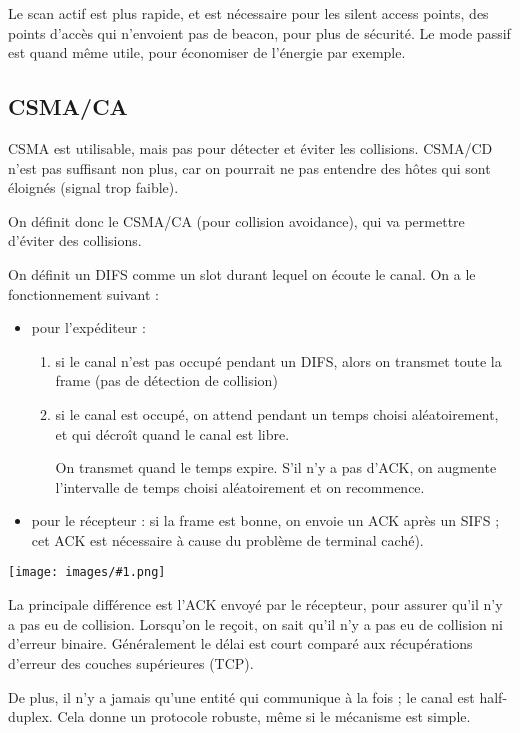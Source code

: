 \documentclass[10pt,a4paper]{report}
\newcommand{\dessin}[1]{\begin{center}\texttt{[image: images/\#1.png]}\end{center}}
\begin{document}
		 Le scan actif est plus rapide, et est nécessaire pour les silent access points, des points d'accès qui n'envoient pas de beacon, pour plus de sécurité. Le mode passif est quand même utile, pour économiser de l'énergie par exemple.
		 
		\subsection{CSMA/CA}
		
		CSMA est utilisable, mais pas pour détecter et éviter les collisions. CSMA/CD n'est pas suffisant non plus, car on pourrait ne pas entendre des hôtes qui sont éloignés (signal trop faible).
		
		On définit donc le CSMA/CA (pour collision avoidance), qui va permettre d'éviter des collisions. 
		
		On définit un DIFS comme un slot durant lequel on écoute le canal. On a le fonctionnement suivant :
		
		\begin{itemize}
			\item pour l'expéditeur :
			
			\begin{enumerate}
				\item si le canal n'est pas occupé pendant un DIFS, alors on transmet toute la frame (pas de détection de collision)
				\item si le canal est occupé, on attend pendant un temps choisi aléatoirement, et qui décroît quand le canal est libre.
				
				On transmet quand le temps expire. S'il n'y a pas d'ACK, on augmente l'intervalle de temps choisi aléatoirement et on recommence.
			\end{enumerate}
			
			\item pour le récepteur : si la frame est bonne, on envoie un ACK après un SIFS ; cet ACK est nécessaire à cause du problème de terminal caché).
			
		\end{itemize}
		
		\dessin{36}
				
		La principale différence est l'ACK envoyé par le récepteur, pour assurer qu'il n'y a pas eu de collision. Lorsqu'on le reçoit, on sait qu'il n'y a pas eu de collision ni d'erreur binaire. Généralement le délai est court comparé aux récupérations d'erreur des couches supérieures (TCP).
		
		De plus, il n'y a jamais qu'une entité qui communique à la fois ; le canal est half-duplex. Cela donne un protocole robuste, même si le mécanisme est simple.
		
\end{document}
